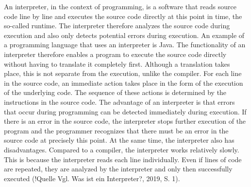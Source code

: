 An interpreter, in the context of programming, is a software that reads source code line by line and executes the source code directly at this point in time, the so-called runtime. The interpreter therefore analyzes the source code during execution and also only detects potential errors during execution. An example of a programming language that uses an interpreter is Java.
The functionality of an interpreter therefore enables a program to execute the source code directly without having to translate it completely first. Although a translation takes place, this is not separate from the execution, unlike the compiler. For each line in the source code, an immediate action takes place in the form of the execution of the underlying code. The sequence of these actions is determined by the instructions in the source code.
The advantage of an interpreter is that errors that occur during programming can be detected immediately during execution. If there is an error in the source code, the interpreter stops further execution of the program and the programmer recognizes that there must be an error in the source code at precisely this point.
At the same time, the interpreter also has disadvantages. Compared to a compiler, the interpreter works relatively slowly. This is because the interpreter reads each line individually. Even if lines of code are repeated, they are analyzed by the interpreter and only then successfully executed (!Quelle Vgl. Was ist ein Interpreter?, 2019, S. 1).